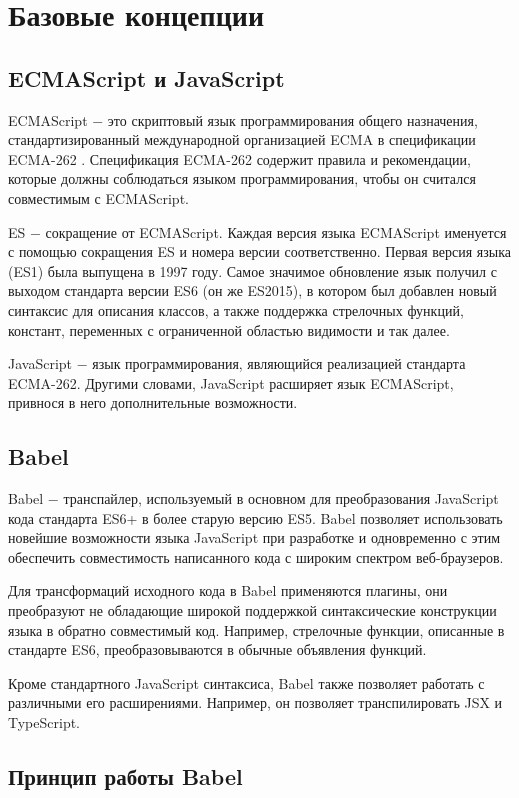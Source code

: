 \documentclass[14pt, a4paper]{article}
\begin{document}
\pagebreak
\section{Базовые концепции}
\subsection{ECMAScript и JavaScript}
ECMAScript $-$ это скриптовый язык программирования общего назначения, стандартизированный международной 
организацией ECMA в спецификации ECMA-262 \cite{ecma-262}. Спецификация ECMA-262 содержит правила и рекомендации, 
которые должны соблюдаться языком программирования, чтобы он считался совместимым с ECMAScript.

ES $-$ сокращение от ECMAScript. Каждая версия языка ECMAScript именуется с помощью сокращения ES и 
номера версии соответственно. Первая версия языка (ES1)  была выпущена в 1997 году. Самое значимое 
обновление язык получил с выходом стандарта версии ES6 (он же ES2015), в котором был добавлен новый 
синтаксис для описания классов, а также поддержка стрелочных функций, констант,  переменных с ограниченной областью 
видимости и так далее.

JavaScript $-$ язык программирования, являющийся реализацией стандарта ECMA-262. Другими словами, 
JavaScript расширяет язык ECMAScript, привнося в него дополнительные возможности.

\subsection{Babel}
Babel $-$  транспайлер, используемый в основном для преобразования JavaScript кода стандарта ES6+ в 
более старую версию ES5. Babel позволяет использовать новейшие возможности языка  JavaScript при 
разработке и одновременно с этим обеспечить совместимость написанного кода с широким спектром веб-браузеров.

Для трансформаций исходного кода в Babel применяются плагины, они преобразуют не обладающие широкой 
поддержкой синтаксические конструкции языка в обратно совместимый код. Например, стрелочные функции, 
описанные в стандарте ES6, преобразовываются в обычные объявления функций.

Кроме стандартного JavaScript синтаксиса, Babel также позволяет работать с различными его расширениями.
Например, он позволяет транспилировать JSX и TypeScript.

\subsection{Принцип работы Babel}
\end{document}
